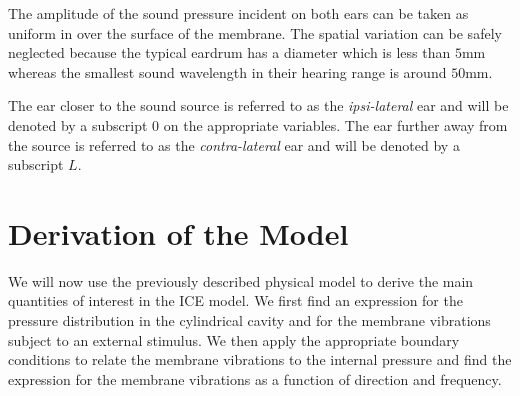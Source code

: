 The amplitude of the sound pressure incident on both ears can be taken as uniform in over 
the surface of the membrane. The spatial variation can be safely neglected because the
typical eardrum has a diameter which is less than $5$mm whereas the smallest sound wavelength
in their hearing range is around $50$mm.

The ear closer to the sound source is referred to as the \textit{ipsi-lateral} ear and
will be denoted by a subscript $0$ on the appropriate variables. The ear further away from the source is referred to
as the \textit{contra-lateral} ear and will be denoted by a subscript $L$.

\section{Derivation of the Model}
We will now use the previously described physical model to derive the main quantities of interest in the ICE model. We first find an expression
for the pressure distribution in the cylindrical cavity and for the membrane vibrations subject to an external stimulus. We then apply the 
appropriate boundary conditions to relate the membrane vibrations to the internal pressure and find the expression for the membrane
vibrations as a function of direction and frequency.
